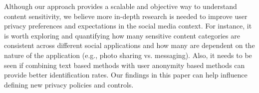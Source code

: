 \documentclass[conference]{IEEEtran}
\begin{document}
Although our approach provides a scalable and objective way to understand content sensitivity, we believe more in-depth research is needed to improve user privacy preferences and expectations in the social media context. For instance, it is worth exploring and quantifying how many sensitive content categories are consistent across different social applications and how many are dependent on the nature of the application (e.g., photo sharing vs. messaging). Also, it needs to be seen if combining text based methods with user anonymity based methods can provide better identification rates. Our findings in this paper can help influence defining new privacy policies and controls. 



\end{document}
